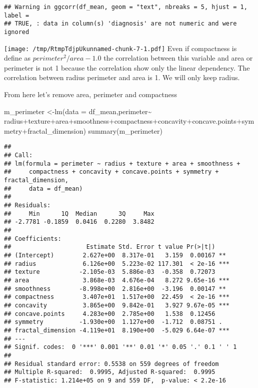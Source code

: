 \documentclass[
  11pt,
]{article}
\newenvironment{Shaded}{\begin{snugshade}}{\end{snugshade}}
\newcommand{\AttributeTok}[1]{\textcolor[rgb]{0.77,0.63,0.00}{#1}}
\newcommand{\FunctionTok}[1]{\textcolor[rgb]{0.00,0.00,0.00}{#1}}
\newcommand{\NormalTok}[1]{#1}
\newcommand{\OtherTok}[1]{\textcolor[rgb]{0.56,0.35,0.01}{#1}}
\newcommand{\SpecialCharTok}[1]{\textcolor[rgb]{0.00,0.00,0.00}{#1}}
\begin{document}
\begin{verbatim}
## Warning in ggcorr(df_mean, geom = "text", nbreaks = 5, hjust = 1, label =
## TRUE, : data in column(s) 'diagnosis' are not numeric and were ignored
\end{verbatim}

\texttt{[image: /tmp/RtmpTdjpUkunnamed-chunk-7-1.pdf]} Even if
compactness is define as \(perimeter^2 / area - 1.0\) the correlation
between this variable and area or perimeter is not 1 because the
correlation show only the linear dependency. The correlation between
radius perimeter and area is 1. We will only keep radius.

From here let's remove area, perimeter and compactness

\begin{Shaded}
\begin{Highlighting}[]
\NormalTok{m\_perimeter }\OtherTok{\textless{}{-}}\FunctionTok{lm}\NormalTok{(}\AttributeTok{data =}\NormalTok{ df\_mean,perimeter}\SpecialCharTok{\textasciitilde{}}\NormalTok{ radius}\SpecialCharTok{+}\NormalTok{texture}\SpecialCharTok{+}\NormalTok{area}\SpecialCharTok{+}\NormalTok{smoothness}\SpecialCharTok{+}\NormalTok{compactness}\SpecialCharTok{+}\NormalTok{concavity}\SpecialCharTok{+}\NormalTok{concave.points}\SpecialCharTok{+}\NormalTok{symmetry}\SpecialCharTok{+}\NormalTok{fractal\_dimension)}
\FunctionTok{summary}\NormalTok{(m\_perimeter)}
\end{Highlighting}
\end{Shaded}

\begin{verbatim}
## 
## Call:
## lm(formula = perimeter ~ radius + texture + area + smoothness + 
##     compactness + concavity + concave.points + symmetry + fractal_dimension, 
##     data = df_mean)
## 
## Residuals:
##     Min      1Q  Median      3Q     Max 
## -2.7781 -0.1859  0.0416  0.2280  3.8482 
## 
## Coefficients:
##                     Estimate Std. Error t value Pr(>|t|)    
## (Intercept)        2.627e+00  8.317e-01   3.159  0.00167 ** 
## radius             6.126e+00  5.223e-02 117.301  < 2e-16 ***
## texture           -2.105e-03  5.886e-03  -0.358  0.72073    
## area               3.868e-03  4.676e-04   8.272 9.65e-16 ***
## smoothness        -8.998e+00  2.816e+00  -3.196  0.00147 ** 
## compactness        3.407e+01  1.517e+00  22.459  < 2e-16 ***
## concavity          3.865e+00  9.842e-01   3.927 9.67e-05 ***
## concave.points     4.283e+00  2.785e+00   1.538  0.12456    
## symmetry          -1.930e+00  1.127e+00  -1.712  0.08751 .  
## fractal_dimension -4.119e+01  8.190e+00  -5.029 6.64e-07 ***
## ---
## Signif. codes:  0 '***' 0.001 '**' 0.01 '*' 0.05 '.' 0.1 ' ' 1
## 
## Residual standard error: 0.5538 on 559 degrees of freedom
## Multiple R-squared:  0.9995, Adjusted R-squared:  0.9995 
## F-statistic: 1.214e+05 on 9 and 559 DF,  p-value: < 2.2e-16
\end{verbatim}
\end{document}
